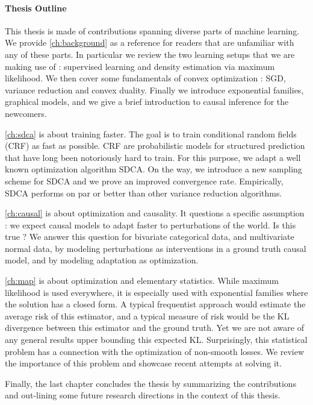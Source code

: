 \paragraph{Thesis Outline}
This thesis is made of contributions spanning diverse parts of machine learning. 
We provide \cref{ch:background} as a reference for readers that are unfamiliar with any of these parts. 
In particular we review the two learning setups that we are making use of : supervised learning and density estimation via maximum likelihood. 
We then cover some fundamentals of convex optimization : SGD, variance reduction and convex duality. 
Finally we introduce exponential families, graphical models, and we give a brief introduction to causal inference for the newcomers.

\cref{ch:sdca} is about training faster. 
The goal is to train conditional random fields (CRF) as fast as possible.
CRF are probabilistic models for structured prediction that have long been notoriously hard to train. 
For this purpose, we adapt a well known optimization algorithm SDCA. 
On the way, we introduce a new sampling scheme for SDCA and we prove an improved convergence rate. 
Empirically, SDCA performs on par or better than other variance reduction algorithms.

\cref{ch:causal} is about optimization and causality.
It questions a specific assumption : we expect causal models to adapt faster to perturbations of the world. Is this true ? 
We answer this question for bivariate categorical data, and multivariate normal data, by modeling  perturbations as interventions in a ground truth causal model, and by modeling adaptation as optimization.

\cref{ch:map} is about optimization and elementary statistics.
While maximum likelihood is used everywhere, it is especially used with exponential families where the solution has a closed form.
A typical frequentist approach would estimate the average risk of this estimator, and a typical measure of risk would be the KL divergence between this estimator and the ground truth. 
Yet we are not aware of any general results upper bounding this expected KL. 
Surprisingly, this statistical problem has a connection with the optimization of non-smooth losses. 
We review the importance of this problem and showcase recent attempts at solving it.

Finally, the last chapter concludes the thesis by summarizing the contributions and out-lining some future research directions in the context of this thesis.



